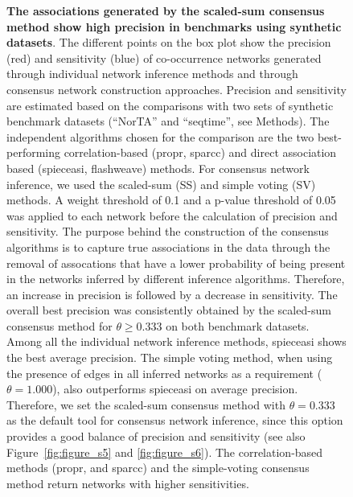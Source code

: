\documentclass[letterpaper,12pt]{article}
\begin{document}
  \begin{figure}[H]
    \centering
    \caption{
      \textbf{The associations generated by the scaled-sum consensus method show high precision in benchmarks using synthetic datasets}.
    The different points on the box plot show the precision (red) and sensitivity (blue) of co-occurrence networks generated through individual network inference methods and through consensus network construction approaches. Precision and sensitivity are estimated based on the comparisons with two sets of synthetic benchmark datasets (``NorTA'' and ``seqtime'', see Methods).
      The independent algorithms chosen for the comparison are the two best-performing correlation-based (propr, sparcc) and direct association based (spieceasi, flashweave) methods.
      For consensus network inference, we used the scaled-sum (SS) and simple voting (SV) methods.
      A weight threshold of 0.1 and a p-value threshold of 0.05 was applied to each network before the calculation of precision and sensitivity.
      The purpose behind the construction of the consensus algorithms is to capture true associations in the data through the removal of assocations that have a lower probability of being present in the networks inferred by different inference algorithms.
      Therefore, an increase in precision is followed by a decrease in sensitivity.
      The overall best precision was consistently obtained by the scaled-sum consensus method for $\theta \geq 0.333$ on both benchmark datasets. Among all the individual network inference methods, spieceasi shows the best average precision.
      The simple voting method, when using the presence of edges in all inferred networks as a requirement ($\theta = 1.000$), also outperforms spieceasi on average precision.
      Therefore, we set the scaled-sum consensus method with $\theta = 0.333$ as the default tool for consensus network inference, since this option provides a good balance of precision and sensitivity (see also Figure~\ref{fig:figure_s5} and \ref{fig:figure_s6}).
      The correlation-based methods (propr, and \acs{sparcc}) and the simple-voting consensus method return networks with higher sensitivities.
    }
    \label{fig:figure5}
  \end{figure}
\end{document}
